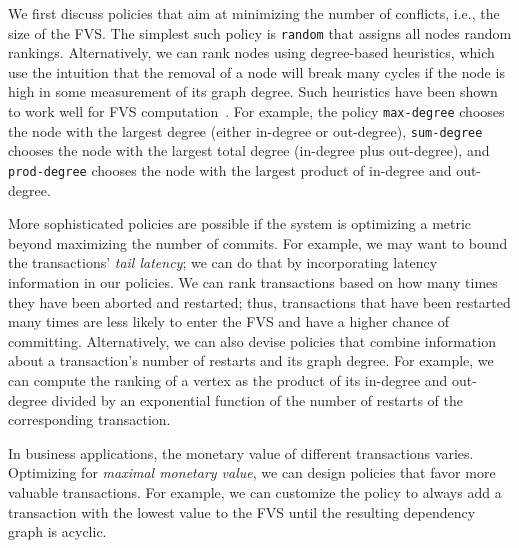 We first discuss policies that aim at minimizing the number of conflicts, i.e., the size of the FVS. The simplest such policy is \texttt{random} that assigns all nodes random rankings. Alternatively, we can rank nodes using degree-based heuristics, which use the intuition that the removal of a node will break many cycles if the node is high in some measurement of its graph degree. Such heuristics have  been shown to work well for FVS computation~\cite{cutello2015targeting}. For example, the policy \texttt{max-degree} chooses the node with the largest degree (either in-degree or out-degree), \texttt{sum-degree} chooses the node with the largest total degree (in-degree plus out-degree), and \texttt{prod-degree} chooses the node with the largest product of in-degree and out-degree. 

More sophisticated policies are possible if the system is optimizing a metric beyond maximizing the number of commits. For example, we may want to bound the transactions' \emph{tail latency}; we can do that by incorporating latency information in our policies. We can rank transactions based on how many times they have been aborted and restarted; thus, transactions that have been restarted many times are less likely to enter the FVS and have a higher chance of committing. Alternatively, we can also devise policies that combine information about a transaction's number of restarts and its graph degree. For example, we can compute the ranking of a vertex as the product of its in-degree and out-degree divided by an exponential function of the number of restarts of the corresponding transaction. 


In business applications, the monetary value of different transactions varies. Optimizing for \emph{maximal monetary value}, we can design policies that favor more valuable transactions. For example, we can customize the policy to always add a transaction with the lowest value to the FVS until the resulting dependency graph is acyclic.


